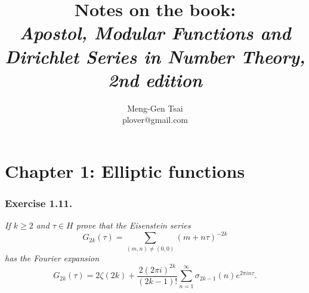 \documentclass{article}
\title{\textbf{Notes on the book: \\
\emph{Apostol, Modular Functions and Dirichlet Series in Number Theory, 2nd edition}}}
\author{Meng-Gen Tsai \\ plover@gmail.com}
\begin{document}
\maketitle
\tableofcontents












\newpage
\section*{Chapter 1: Elliptic functions \\}



\subsubsection*{Exercise 1.11.}
\emph{If $k \geq 2$ and $\tau \in H$ prove that the Eisenstein series
\[
  G_{2k}(\tau)
  = \sum_{(m,n) \neq (0,0)} (m+n\tau)^{-2k}
\]
has the Fourier expansion
}
\[
  G_{2k}(\tau)
  =
  2 \zeta(2k) + \frac{2(2\pi i)^{2k}}{(2k-1)!} \sum_{n=1}^{\infty} \sigma_{2k-1}(n) e^{2\pi i n \tau}.
\] \\
\end{document}
